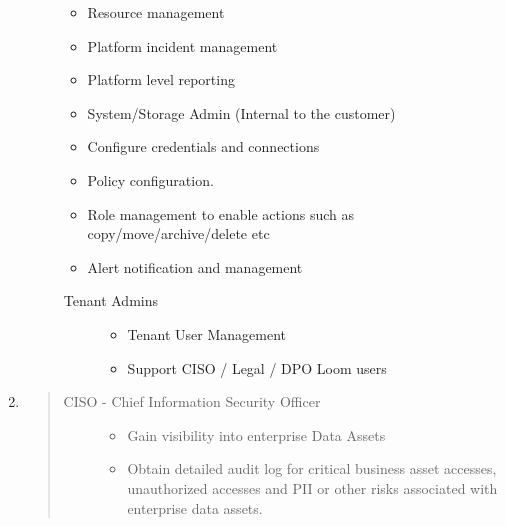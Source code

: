 \documentclass[letterpaper,10pt,english]{sphinxmanual}
\begin{document}
\begin{enumerate}
\begin{description}
\begin{itemize}
\item {} 
Resource management

\item {} 
Platform incident management

\item {} 
Platform level reporting

\item {} 
System/Storage Admin (Internal to the customer)

\item {} 
Configure credentials and connections

\item {} 
Policy configuration.

\item {} 
Role management to enable actions such as copy/move/archive/delete etc

\item {} 
Alert notification and management

\end{itemize}
\begin{description}
\item[{Tenant Admins}] \leavevmode\begin{itemize}
\item {} 
Tenant User Management

\item {} 
Support CISO / Legal / DPO Loom users

\end{itemize}

\end{description}

\end{description}

\item {} 
\begin{quote}
\begin{description}
\item[{CISO - Chief Information Security Officer}] \leavevmode\begin{itemize}
\item {} 
Gain visibility into enterprise Data Assets

\item {} 
Obtain detailed audit log for critical business asset accesses, unauthorized accesses and PII or other risks associated with enterprise data assets.


\end{itemize}
\end{description}
\end{quote}
\end{enumerate}
\end{document}

